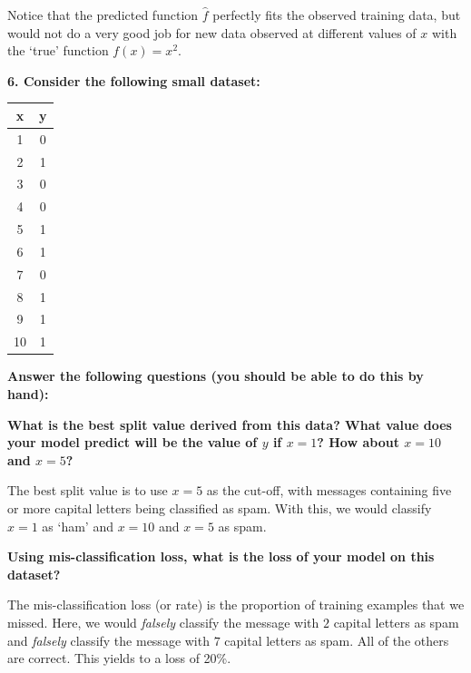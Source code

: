 \documentclass[12pt,hidelinks]{article}
\numberwithin{equation}{section}
\begin{document}
Notice that the predicted function $\widehat{f}$ perfectly fits the observed
training data, but would not do a very good job for new data observed at
different values of $x$ with the `true' function $f(x) = x^2$.

\vspace*{12pt}

\textbf{6. Consider the following small dataset:}

\begin{center}
\begin{tabular}{cc}
x & y \\ \hline
1 & 0 \\
2 & 1 \\
3 & 0 \\
4 & 0 \\
5 & 1 \\
6 & 1 \\
7 & 0 \\
8 & 1 \\
9 & 1 \\
10 & 1 \\
\end{tabular}
\end{center}

\textbf{Answer the following questions (you should be able to do this by hand):}

\textbf{What is the best split value derived from this data? What value does
your model predict will be the value of $y$ if $x = 1$? How about $x=10$ and
$x=5$?}

\vspace*{12pt}

The best split value is to use $x = 5$ as the cut-off, with messages containing
five or more capital letters being classified as spam. With this, we would
classify $x=1$ as `ham' and $x=10$ and $x=5$ as spam.

\vspace*{12pt}

\textbf{Using mis-classification loss, what is the loss of your model on this
dataset?}

\vspace*{12pt}

The mis-classification loss (or rate) is the proportion of training examples
that we missed. Here, we would \textit{falsely} classify the message with $2$
capital letters as spam and \textit{falsely} classify the message with $7$
capital letters as spam. All of the others are correct. This yields to a loss
of 20\%.
\end{document}
